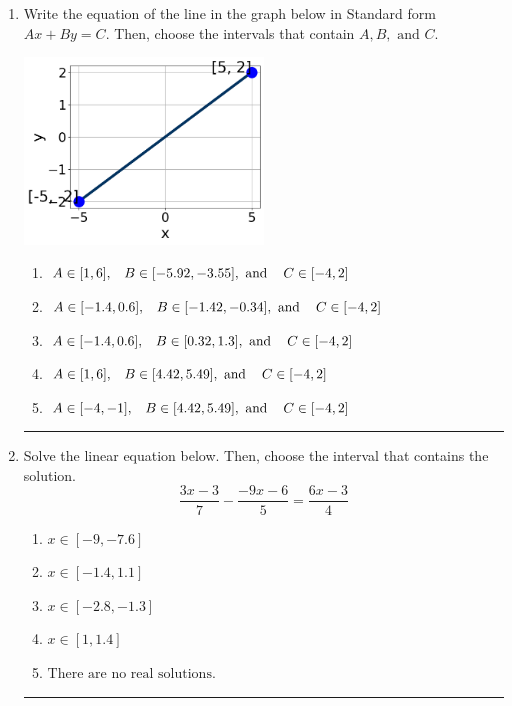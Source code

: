 \documentclass[14pt]{extbook}
\newcommand{\litem}[1]{\item#1\hspace*{-1cm}\rule{\textwidth}{0.4pt}}
\begin{document}
\begin{enumerate}
{\begin{enumerate}[label=\Alph*.]
\end{enumerate} }
\litem{
Write the equation of the line in the graph below in Standard form $Ax+By=C$. Then, choose the intervals that contain $A, B, \text{ and } C$.
\begin{center}
    \includegraphics[width=0.5\textwidth]{../Figures/linearGraphToStandardCopyA.png}
\end{center}
\begin{enumerate}[label=\Alph*.]
\item \( A \in [1, 6], \hspace{3mm} B \in [-5.92, -3.55], \text{ and } \hspace{3mm} C \in [-4, 2] \)
\item \( A \in [-1.4, 0.6], \hspace{3mm} B \in [-1.42, -0.34], \text{ and } \hspace{3mm} C \in [-4, 2] \)
\item \( A \in [-1.4, 0.6], \hspace{3mm} B \in [0.32, 1.3], \text{ and } \hspace{3mm} C \in [-4, 2] \)
\item \( A \in [1, 6], \hspace{3mm} B \in [4.42, 5.49], \text{ and } \hspace{3mm} C \in [-4, 2] \)
\item \( A \in [-4, -1], \hspace{3mm} B \in [4.42, 5.49], \text{ and } \hspace{3mm} C \in [-4, 2] \)

\end{enumerate} }
\litem{
Solve the linear equation below. Then, choose the interval that contains the solution.\[ \frac{3x -3}{7} - \frac{-9x -6}{5} = \frac{6x -3}{4} \]\begin{enumerate}[label=\Alph*.]
\item \( x \in [-9, -7.6] \)
\item \( x \in [-1.4, 1.1] \)
\item \( x \in [-2.8, -1.3] \)
\item \( x \in [1, 1.4] \)
\item \( \text{There are no real solutions.} \)


\end{enumerate}}
\end{enumerate}
\end{document}

